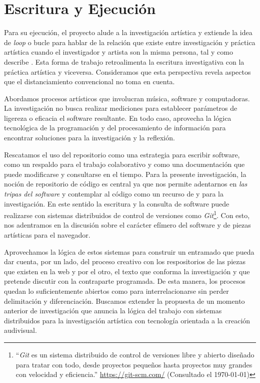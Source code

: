 

\section*{Escritura y Ejecución}

Para su ejecución, el proyecto alude a la investigación artística y extiende la idea de \textit{loop} o bucle para hablar de la relación que existe entre investigación y práctica artística cuando el investigador y artista son la misma persona, tal y como describe \cite{ocelotlMas}. Esta forma de trabajo retroalimenta la escritura investigativa con la práctica artística y viceversa. Consideramos que esta perspectiva revela aspectos que el distanciamiento convencional no toma en cuenta.

Abordamos procesos artísticos que involucran música, software y computadoras. La investigación no busca realizar mediciones para establecer parámetros de ligereza o eficacia el software resultante. En todo caso, aprovecha la lógica tecnológica de la programación y del procesamiento de información para encontrar soluciones para la investigación y la reflexión.

Rescatamos el uso del repositorio como una estrategia para escribir software, como un respaldo para el trabajo colaborativo y como una documentación que puede modificarse y consultarse en el tiempo. Para la presente investigación, la noción de repositorio de código es central ya que nos permite adentarnos en \textit{las tripas del software} y contemplar al código como un recurso de y para la investigación. En este sentido la escritura y la consulta de software puede realizarse con sistemas distribuidos de control de versiones como \textit{Git}\footnote{``\textit{Git} es un sistema distribuido de control de versiones libre y abierto diseñado para tratar con todo, desde proyectos pequeños hasta proyectos muy grandes con velocidad y eficiencia.'' \url{https://git-scm.com/} (Consultado el \today)}. Con esto, nos adentramos en la discusión sobre el carácter efímero del software y de piezas artísticas para el navegador. 

Aprovechamos la lógica de estos sistemas para construir un entramado que pueda dar cuenta, por un lado, del proceso creativo con los respositorios de las piezas que existen en la web y por el otro, el texto que conforma la investigación y que pretende discutir con la contraparte programada. De esta manera, los procesos quedan lo suficientemente abiertos como para interrelacionarse sin perder delimitación y diferenciación. Buscamos extender la propuesta de un momento anterior de investigación que anuncia la lógica del trabajo con sistemas distribuidos para la investigación artística con tecnología orientada a la creación audivisual.

